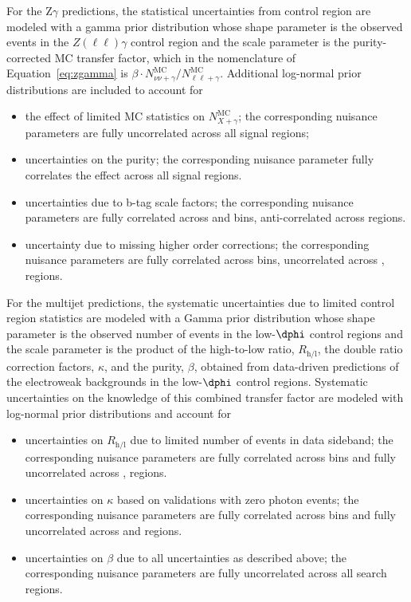 For the Z$\gamma$ predictions, the statistical uncertainties from control 
region are modeled with a gamma
prior distribution whose shape parameter is the observed events in the 
$Z(\ell\ell)\gamma$ control region and the scale parameter is the 
purity-corrected MC transfer factor, which in the nomenclature of 
Equation~\ref{eq:zgamma} is 
$\beta\cdot N_{\nu\nu+\gamma}^{\mathrm{MC}}/N_{\ell\ell+\gamma}^{\mathrm{MC}}$.
Additional log-normal prior distributions are included to account 
for
\begin{itemize}
 \item the effect of limited MC statistics on $N_{X+\gamma}^{\mathrm{MC}}$; the corresponding nuisance parameters are fully uncorrelated across all signal regions;
 \item uncertainties on the purity; the corresponding nuisance parameter fully correlates the effect across all signal regions.
 \item uncertainties due to b-tag scale factors; the corresponding nuisance parameters are fully correlated across \ptmiss and \nj bins, anti-correlated across \nb regions.
 \item uncertainty due to missing higher order corrections; the corresponding nuisance parameters are fully correlated across \ptmiss bins, uncorrelated across \nb, \nj regions.
\end{itemize}


For the multijet predictions, the systematic uncertainties due to limited 
control region statistics are modeled with a 
Gamma prior distribution whose shape parameter is the observed number
of events in the low-$\dphi$ control regions and the scale parameter
is the product of the high-to-low ratio, $R_{\mathrm{h/l}}$, the double ratio
correction factors, $\kappa$, and the purity, $\beta$, obtained from data-driven predictions
of the electroweak backgrounds in the low-$\dphi$ control regions. 
Systematic uncertainties on the knowledge of this combined transfer factor are 
modeled with log-normal prior distributions and account for

\begin{itemize}
 \item uncertainties on $R_{\mathrm{h/l}}$ due to limited number of events in data sideband; the corresponding nuisance parameters 
 are fully correlated across \ptmiss bins and fully uncorrelated across \nb, \nj regions.
 \item uncertainties on $\kappa$ based on validations with zero photon events; the corresponding nuisance parameters are fully 
   correlated across \ptmiss bins and fully uncorrelated across \nb and \nj regions.
 \item uncertainties on $\beta$ due to all uncertainties as described above; the corresponding nuisance parameters are 
  fully uncorrelated across all search regions.
\end{itemize} 


